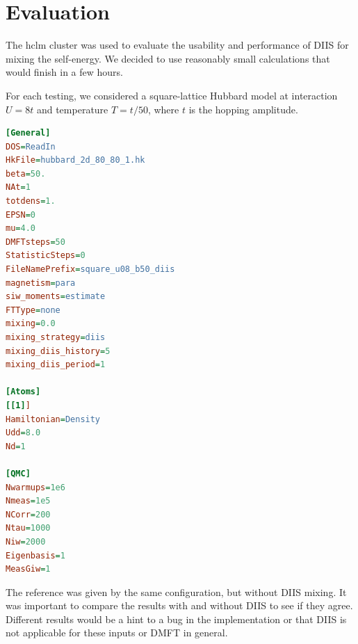 \chapter{Evaluation}
\label{ch:evaluation}
The hclm cluster was used to evaluate the usability and performance of DIIS for mixing the self-energy. We decided to use reasonably small calculations that would finish in a few hours.

For each testing, we considered a square-lattice Hubbard model at interaction $U=8t$ and temperature $T=t/50$, where $t$ is the hopping amplitude.


\begin{lstlisting}[label=lst:w2dyn_config, language=ini, caption=The w2dynmaics configuration for this case]
[General]
DOS=ReadIn
HkFile=hubbard_2d_80_80_1.hk
beta=50.
NAt=1
totdens=1.
EPSN=0
mu=4.0
DMFTsteps=50
StatisticSteps=0
FileNamePrefix=square_u08_b50_diis
magnetism=para
siw_moments=estimate
FTType=none
mixing=0.0
mixing_strategy=diis
mixing_diis_history=5
mixing_diis_period=1

[Atoms]
[[1]]
Hamiltonian=Density
Udd=8.0
Nd=1

[QMC]
Nwarmups=1e6
Nmeas=1e5
NCorr=200
Ntau=1000
Niw=2000
Eigenbasis=1 
MeasGiw=1
\end{lstlisting}

The reference was given by the same configuration, but without DIIS mixing. It was important to compare the results with and without DIIS to see if they agree. Different results would be a hint to a bug in the implementation or that DIIS is not applicable for these inputs or DMFT in general.

